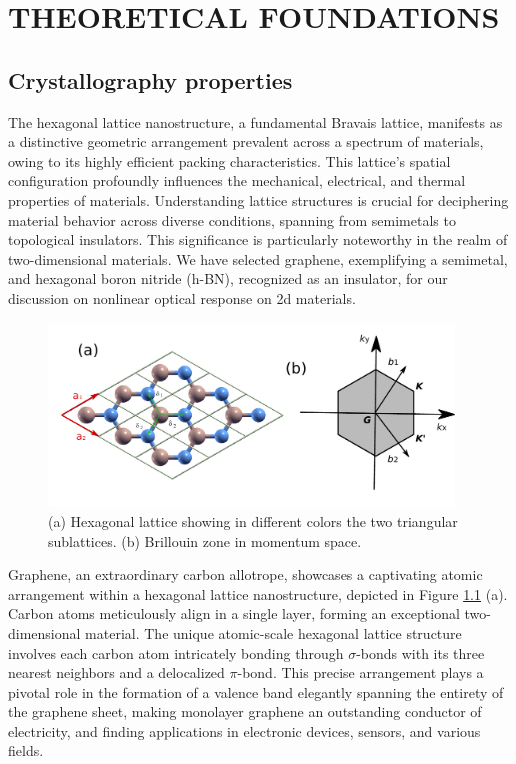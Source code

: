 \chapter{THEORETICAL FOUNDATIONS} 
\label{ch:ch2}
\section{Crystallography properties}
The hexagonal lattice nanostructure, a fundamental Bravais lattice, manifests as a distinctive geometric arrangement prevalent across a spectrum of materials, owing to its highly efficient packing characteristics. This lattice's spatial configuration profoundly influences the mechanical, electrical, and thermal properties of materials. Understanding lattice structures is crucial for deciphering material behavior across diverse conditions, spanning from semimetals to topological insulators. This significance is particularly noteworthy in the realm of two-dimensional materials. We have selected graphene, exemplifying a semimetal, and hexagonal boron nitride (h-BN), recognized as an insulator, for our discussion on nonlinear optical response on 2d materials.\\
\begin{figure}[htpb]
    \centering
    \includegraphics[width=0.96\textwidth]{pic/lattice.pdf}
    \caption[Lab coordinate system]{(a) Hexagonal lattice showing in different colors the two triangular sublattices. (b) Brillouin zone in momentum space.}
    \label{fig: lattice}
\end{figure}
Graphene, an extraordinary carbon allotrope, showcases a captivating atomic arrangement within a hexagonal lattice nanostructure, depicted in Figure \ref{fig: lattice} (a). Carbon atoms meticulously align in a single layer, forming an exceptional two-dimensional material. The unique atomic-scale hexagonal lattice structure involves each carbon atom intricately bonding through $\sigma$-bonds with its three nearest neighbors and a delocalized $\pi$-bond. This precise arrangement plays a pivotal role in the formation of a valence band elegantly spanning the entirety of the graphene sheet, making monolayer graphene an outstanding conductor of electricity, and finding applications in electronic devices, sensors, and various fields.

